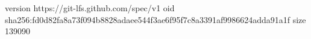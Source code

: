 version https://git-lfs.github.com/spec/v1
oid sha256:fd0d82fa8a73f094b8828adaee544f3ae6f95f7c8a3391af9986624adda91a1f
size 139090
